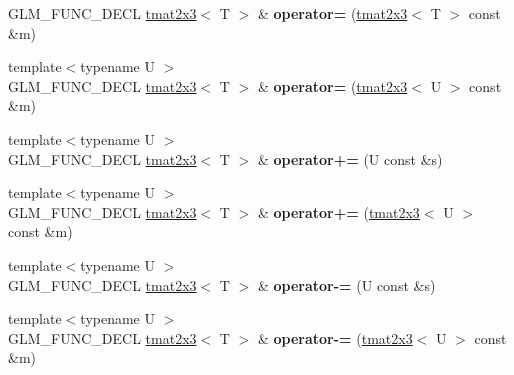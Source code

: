 \begin{DoxyCompactItemize}
\item 
\hypertarget{structglm_1_1detail_1_1tmat2x3_a0d57237fc072d33d7894af60e62a65d4}{}G\+L\+M\+\_\+\+F\+U\+N\+C\+\_\+\+D\+E\+C\+L \hyperlink{structglm_1_1detail_1_1tmat2x3}{tmat2x3}$<$ T $>$ \& {\bfseries operator=} (\hyperlink{structglm_1_1detail_1_1tmat2x3}{tmat2x3}$<$ T $>$ const \&m)\label{structglm_1_1detail_1_1tmat2x3_a0d57237fc072d33d7894af60e62a65d4}

\item 
\hypertarget{structglm_1_1detail_1_1tmat2x3_a452832f7dbdecbaef24e0d225dc16afd}{}{\footnotesize template$<$typename U $>$ }\\G\+L\+M\+\_\+\+F\+U\+N\+C\+\_\+\+D\+E\+C\+L \hyperlink{structglm_1_1detail_1_1tmat2x3}{tmat2x3}$<$ T $>$ \& {\bfseries operator=} (\hyperlink{structglm_1_1detail_1_1tmat2x3}{tmat2x3}$<$ U $>$ const \&m)\label{structglm_1_1detail_1_1tmat2x3_a452832f7dbdecbaef24e0d225dc16afd}

\item 
\hypertarget{structglm_1_1detail_1_1tmat2x3_ae497a8b380033cc76f7774fda52332c7}{}{\footnotesize template$<$typename U $>$ }\\G\+L\+M\+\_\+\+F\+U\+N\+C\+\_\+\+D\+E\+C\+L \hyperlink{structglm_1_1detail_1_1tmat2x3}{tmat2x3}$<$ T $>$ \& {\bfseries operator+=} (U const \&s)\label{structglm_1_1detail_1_1tmat2x3_ae497a8b380033cc76f7774fda52332c7}

\item 
\hypertarget{structglm_1_1detail_1_1tmat2x3_adffac5496f72728cdc390b84852bb7ef}{}{\footnotesize template$<$typename U $>$ }\\G\+L\+M\+\_\+\+F\+U\+N\+C\+\_\+\+D\+E\+C\+L \hyperlink{structglm_1_1detail_1_1tmat2x3}{tmat2x3}$<$ T $>$ \& {\bfseries operator+=} (\hyperlink{structglm_1_1detail_1_1tmat2x3}{tmat2x3}$<$ U $>$ const \&m)\label{structglm_1_1detail_1_1tmat2x3_adffac5496f72728cdc390b84852bb7ef}

\item 
\hypertarget{structglm_1_1detail_1_1tmat2x3_a612df921324d1dfbb66b008110551faa}{}{\footnotesize template$<$typename U $>$ }\\G\+L\+M\+\_\+\+F\+U\+N\+C\+\_\+\+D\+E\+C\+L \hyperlink{structglm_1_1detail_1_1tmat2x3}{tmat2x3}$<$ T $>$ \& {\bfseries operator-\/=} (U const \&s)\label{structglm_1_1detail_1_1tmat2x3_a612df921324d1dfbb66b008110551faa}

\item 
\hypertarget{structglm_1_1detail_1_1tmat2x3_ac10b50f9f4a19ab14cf4f4063ff28284}{}{\footnotesize template$<$typename U $>$ }\\G\+L\+M\+\_\+\+F\+U\+N\+C\+\_\+\+D\+E\+C\+L \hyperlink{structglm_1_1detail_1_1tmat2x3}{tmat2x3}$<$ T $>$ \& {\bfseries operator-\/=} (\hyperlink{structglm_1_1detail_1_1tmat2x3}{tmat2x3}$<$ U $>$ const \&m)\label{structglm_1_1detail_1_1tmat2x3_ac10b50f9f4a19ab14cf4f4063ff28284}


\end{DoxyCompactItemize}

